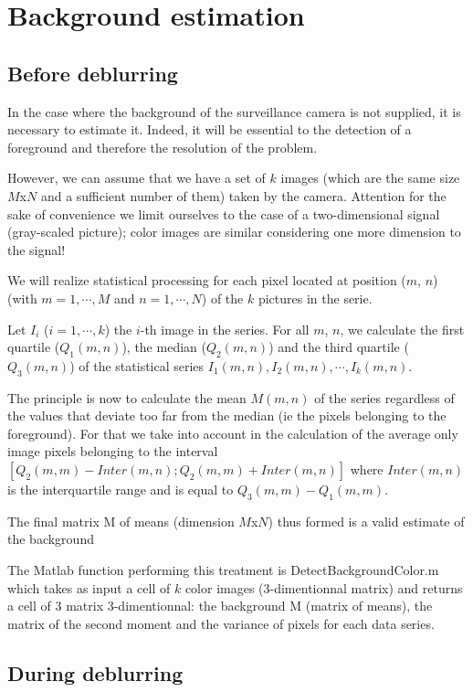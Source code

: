 \section{Background estimation}
\label{sec:Bg}
\subsection{Before deblurring}

In the case where the background of the surveillance camera is not supplied, it is necessary to estimate it. Indeed, it will be essential to the detection of a foreground and therefore the resolution of the problem.

However, we can assume that we have a set of $k$ images (which are the same size $M$x$N$ and a sufficient number of them) taken by the camera. Attention for the sake of convenience we limit ourselves to the case of a two-dimensional signal (gray-scaled picture); color images are similar considering one more dimension to the signal!

We will realize statistical processing for each pixel located at position ($m$, $n$) (with $m =1, \cdots, M$ and $n=1, \cdots, N$) of the $k$ pictures in the serie.

Let $I_i$ ($i=1,\cdots,k$) the $i$-th image in the series. For all $m$, $n$, we calculate the first quartile ($Q_1 (m, n)$), the median ($Q_2 (m, n) $) and the third quartile ($Q_3(m, n)$) of the statistical series $I_1(m, n), I_2(m, n), \cdots, I_k(m, n)$.

The principle is now to calculate the mean $M(m, n)$ of the series regardless of the values ​​that deviate too far from the median (ie the pixels belonging to the foreground). For that we take into account in the calculation of the average only image pixels belonging to the interval $[Q_2 (m, m) - Inter (m, n); Q_2 (m, m) + Inter (m, n) ]$ where $Inter (m, n)$ is the interquartile range and is equal to $Q_3 (m, m) - Q_1 (m, m)$.

The final matrix M of means (dimension $M$x$N$) thus formed  is a valid estimate of the background

The Matlab function performing this treatment is DetectBackgroundColor.m which takes as input a cell of $ k$ color images (3-dimentionnal matrix) and returns a cell of 3 matrix 3-dimentionnal: the background M (matrix of means), the matrix of the second moment and the variance of pixels for each data series.

\subsection{During deblurring}

